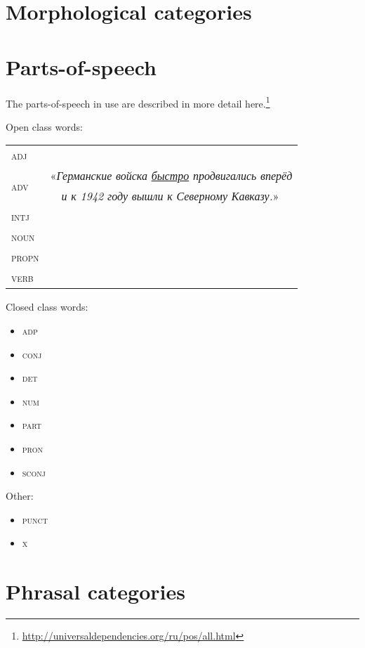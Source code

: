 \documentclass[a4paper,11pt, onecolumn,twoside]{article}
\newcommand{\gmk}[1]{{\rm {\ll \textsc{#1}}}}
\begin{document}
\section{Morphological categories}

\section{Parts-of-speech}

The parts-of-speech in use are described in more detail here.\footnote{\url{http://universaldependencies.org/ru/pos/all.html}}

Open class words:

\begin{tabular}{ll}
   \gmk{adj} &    \\
   \multirow{2}{*}{\gmk{adv}} & «\emph{Германские войска \underline{быстро} продвигались вперёд} \\
                              & ~~\emph{и к 1942 году вышли к Северному Кавказу.}» \\
   \gmk{intj} &  \\
   \gmk{noun} &  \\
   \gmk{propn} &  \\
   \gmk{verb} &  \\
\end{tabular}

Closed class words:

\begin{itemize}
   \item \gmk{adp}
   \item \gmk{conj}
   \item \gmk{det}
   \item \gmk{num}
   \item \gmk{part}
   \item \gmk{pron}
   \item \gmk{sconj}
\end{itemize}

Other:

\begin{itemize}
   \item \gmk{punct}
   \item \gmk{x}
\end{itemize}

\section{Phrasal categories}
\end{document}
